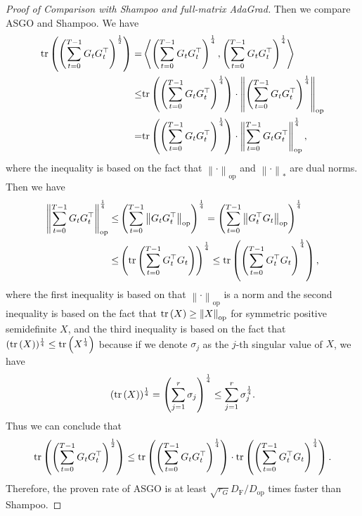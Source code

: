 \documentclass{article}
\theoremstyle{remark}
\newcommand{\Norm}[1]{\left\|#1\right\|}
\newcommand{\dotprod}[2]{\left\langle#1,#2\right\rangle}
\newcommand{\tr}[1]{{\rm tr}\left( #1 \right)}
\begin{document}
\begin{proof}[Proof of Comparison with Shampoo and full-matrix AdaGrad]
Then we compare ASGO and Shampoo. We have
\begin{align*}
    \tr{\left( \sum_{t=0}^{T-1} G_t G_t^\top \right)^{\frac{1}{2}}} =& \dotprod{\left( \sum_{t=0}^{T-1} G_t G_t^\top \right)^{\frac{1}{4}}}{\left( \sum_{t=0}^{T-1} G_t G_t^\top \right)^{\frac{1}{4}}} \\
    \le& \tr{\left( \sum_{t=0}^{T-1} G_t G_t^\top \right)^{\frac{1}{4}}} \cdot \Norm{\left( \sum_{t=0}^{T-1} G_t G_t^\top \right)^{\frac{1}{4}}}_{\mathrm{op}} \\
    =&
    \tr{\left( \sum_{t=0}^{T-1} G_t G_t^\top \right)^{\frac{1}{4}}} \cdot \Norm{\sum_{t=0}^{T-1} G_t G_t^\top }_{\mathrm{op}}^{\frac{1}{4}} ,
\end{align*}
where the inequality is based on the fact that $\Norm{\cdot}_{\mathrm{op}}$ and $\Norm{\cdot}_*$ are dual norms. Then we have
\begin{align*}
    \Norm{\sum_{t=0}^{T-1} G_t G_t^\top }_{\mathrm{op}}^{\frac{1}{4}} \le&
    \left( \sum_{t=0}^{T-1}\Norm{ G_t G_t^\top }_{\mathrm{op}} \right)^{\frac{1}{4}}
    =
    \left( \sum_{t=0}^{T-1}\Norm{ G_t^\top G_t }_{\mathrm{op}} \right)^{\frac{1}{4}} \\
    \le&
    \left( \tr{ \sum_{t=0}^{T-1} G_t^\top G_t } \right)^{\frac{1}{4}}
    \le
    \tr{ \left( \sum_{t=0}^{T-1} G_t^\top G_t \right)^{^{\frac{1}{4}}} } ,
\end{align*}
where the first inequality is based on that $\Norm{\cdot}_{\mathrm{op}}$ is a norm and the second inequality is based on the fact that $\tr{X} \ge \Norm{X}_{\mathrm{op}}$ for symmetric positive semidefinite $X$, and the third inequality is based on the fact that $(\tr{X})^{\frac{1}{4}} \le \tr{X^{\frac{1}{4}}}$ because if we denote $\sigma_j$ as the $j$-th singular value of $X$, we have
\begin{align*}
    (\tr{X})^{\frac{1}{4}} = \left( \sum_{j=1}^r \sigma_j \right)^{\frac{1}{4}} \le \sum_{j=1}^r \sigma_j^{\frac{1}{4}}.
\end{align*}
Thus we can conclude that
\begin{align*}
    \tr{\left( \sum_{t=0}^{T-1} G_t G_t^\top \right)^{\frac{1}{2}}} \le \tr{\left( \sum_{t=0}^{T-1} G_t G_t^\top \right)^{\frac{1}{4}}} \cdot \tr{\left( \sum_{t=0}^{T-1} G_t^{\top} G_t \right)^{\frac{1}{4}}} .
\end{align*}
Therefore, the proven rate of ASGO is at least $\sqrt{r_G} D_{\mathrm{F}}/ D_{\mathrm{op}}$ times faster than Shampoo.
\end{proof}
\end{document}
